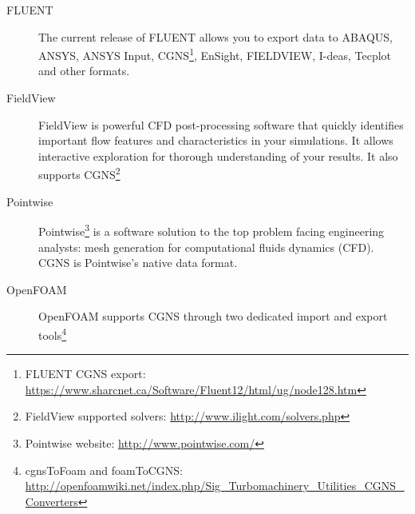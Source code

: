 \begin{description}
\item[FLUENT]  The current  release of  FLUENT allows  you to  export  data to
ABAQUS,    ANSYS,    ANSYS    Input,   CGNS\footnote{FLUENT    CGNS    export:
\url{https://www.sharcnet.ca/Software/Fluent12/html/ug/node128.htm}}, EnSight,
FIELDVIEW, I-deas, Tecplot and other formats.

\item[FieldView]  FieldView  is  powerful  CFD post-processing  software  that
quickly  identifies  important  flow  features  and  characteristics  in  your
simulations. It  allows interactive exploration for  thorough understanding of
your  results.  It also  supports  CGNS\footnote{FieldView supported  solvers:
\url{http://www.ilight.com/solvers.php}}

\item[Pointwise]             Pointwise\footnote{Pointwise             website:
\url{http://www.pointwise.com/}}  is a  software solution  to the  top problem
facing engineering analysts: mesh generation for computational fluids dynamics
(CFD).  CGNS is Pointwise's native data format.

\item[OpenFOAM] OpenFOAM supports CGNS through two dedicated import and export
tools\footnote{cgnsToFoam                    and                   foamToCGNS:
\url{http://openfoamwiki.net/index.php/Sig_Turbomachinery_Utilities_CGNS_Converters}}

\end{description}





